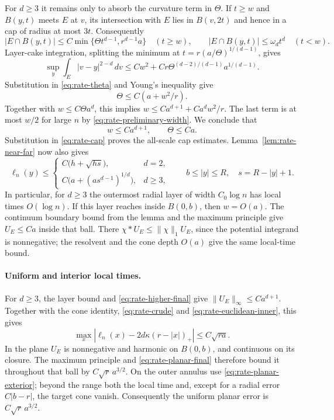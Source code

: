 For $d\ge3$ it remains only to absorb the curvature term in $\Theta$.
If $t\ge w$ and $B(y,t)$ meets $E$ at $v$, its intersection with $E$
lies in $B(v,2t)$ and hence in a cap of radius at most $3t$.
Consequently
\[
 |E\cap B(y,t)|\le C\min\{\Theta t^{d-1},r^{d-1}a\}\quad(t\ge w),
 \qquad |E\cap B(y,t)|\le\omega_dt^d\quad(t<w).
\]
Layer-cake integration, splitting the minimum at
$t=r(a/\Theta)^{1/(d-1)}$, gives
\[
 \sup_y\int_E|v-y|^{2-d}\,dv
 \le Cw^2+Cr\Theta^{(d-2)/(d-1)}a^{1/(d-1)}.
\]
Substitution in \eqref{eq:rate-theta} and Young's inequality give
\begin{equation}\label{eq:rate-theta-improved}
 \Theta\le C(a+w^2/r).
\end{equation}
Together with $w\le C\Theta a^d$, this implies
$w\le Ca^{d+1}+Ca^dw^2/r$. The last term is at most $w/2$ for
large $n$ by \eqref{eq:rate-preliminary-width}. We conclude that
\begin{equation}\label{eq:rate-higher-final}
 w\le Ca^{d+1},\qquad \Theta\le Ca.
\end{equation}
Substitution in \eqref{eq:rate-cap} proves the all-scale cap estimates.
Lemma~\ref{lem:rate-near-far} now also gives
\begin{equation}\label{eq:rate-boundary-profile}
 \ell_n(y)\le
 \begin{cases}
 C\bigl(h+\sqrt{hs}\bigr),&d=2,\\
 C\bigl(a+(as^{d-1})^{1/d}\bigr),&d\ge3,
 \end{cases}
 \qquad b\le|y|\le R,\quad s=R-|y|+1.
\end{equation}
In particular, for $d\ge3$ the outermost radial layer of width
$C_0\log n$ has local times $O(\log n)$. If this layer reaches inside
$B(0,b)$, then $w=O(a)$. The continuum boundary bound from the lemma
and the maximum principle give $U_E\le Ca$ inside that ball.
There $\chi*U_E\le\|\chi\|_1U_E$, since the potential integrand is
nonnegative; the resolvent and the cone depth $O(a)$ give the same
local-time bound.

\paragraph{Uniform and interior local times.}
For $d\ge3$, the layer bound and \eqref{eq:rate-higher-final} give
$\|U_E\|_\infty\le Ca^{d+1}$. Together with the cone identity,
\eqref{eq:rate-crude} and \eqref{eq:rate-euclidean-inner}, this gives
\[
 \max_x|\ell_n(x)-2d\kappa(r-|x|)_+|\le C\sqrt{ra}.
\]
In the plane $U_E$ is nonnegative and harmonic on $B(0,b)$, and continuous
on its closure. The maximum principle and \eqref{eq:rate-planar-final}
therefore bound it throughout that ball by $C\sqrt r\,a^{3/2}$.
On the outer annulus use \eqref{eq:rate-planar-exterior}; beyond the range
both the local time and, except for a radial error $C|b-r|$, the target
cone vanish. Consequently the uniform planar error is
$C\sqrt r\,a^{3/2}$.

